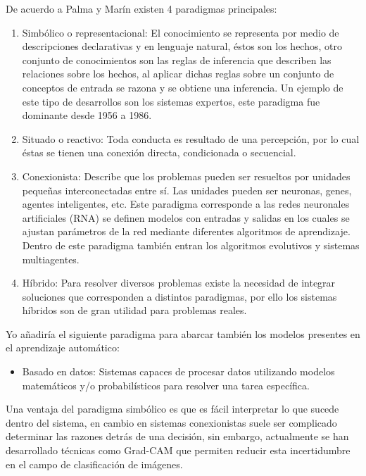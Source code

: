 \documentclass[11pt,fleqn]{book} %
\begin{document}
De acuerdo a Palma y Marín \cite{marin2008inteligencia} existen 4 paradigmas principales:
\begin{enumerate}
\item Simbólico o representacional: El conocimiento se representa por medio de descripciones declarativas y en lenguaje natural, éstos son los hechos, otro conjunto de conocimientos son las reglas de inferencia que describen las relaciones sobre los hechos, al aplicar dichas reglas sobre un conjunto de conceptos de entrada se razona y se obtiene una inferencia.
Un ejemplo de este tipo de desarrollos son los sistemas expertos, este paradigma fue dominante desde 1956 a 1986.

\item Situado o reactivo: Toda conducta es resultado de una percepción, por lo cual éstas se tienen una conexión directa, condicionada o secuencial.

\item Conexionista: Describe que los problemas pueden ser resueltos por unidades pequeñas interconectadas entre sí. Las unidades pueden ser neuronas, genes, agentes inteligentes, etc. Este paradigma corresponde a las redes neuronales artificiales (RNA) se definen modelos con entradas y salidas en los cuales se ajustan parámetros de la red mediante diferentes algoritmos de aprendizaje. Dentro de este paradigma también entran los algoritmos evolutivos y sistemas multiagentes.

\item Híbrido: Para resolver diversos problemas existe la necesidad de integrar soluciones que corresponden a distintos paradigmas, por ello los sistemas híbridos son de gran utilidad para problemas reales.
\end{enumerate}

Yo añadiría el siguiente paradigma para abarcar también los modelos presentes en el aprendizaje automático:
\begin{itemize}
\item Basado en datos: Sistemas capaces de procesar datos utilizando modelos matemáticos y/o probabilísticos para resolver una tarea específica.
\end{itemize}
Una ventaja del paradigma simbólico es que es fácil interpretar lo que sucede dentro del sistema, en cambio en sistemas conexionistas suele ser complicado determinar las razones detrás de una decisión, sin embargo, actualmente se han desarrollado técnicas como Grad-CAM \cite{gradcam} que permiten reducir esta incertidumbre en el campo de clasificación de imágenes.
\end{document}
